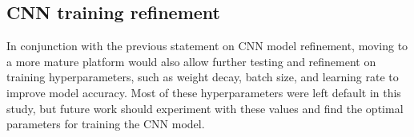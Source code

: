 \documentclass[11pt,letterpaper]{article}
\begin{document}
		\subsection{CNN training refinement}
		In conjunction with the previous statement on CNN model refinement, moving to a more mature platform would also allow further testing and refinement on training hyperparameters, such as weight decay, batch size, and learning rate to improve model accuracy. Most of these hyperparameters were left default in this study, but future work should experiment with these values and find the optimal parameters for training the CNN model.
		
	\newpage
	
    
\end{document}
